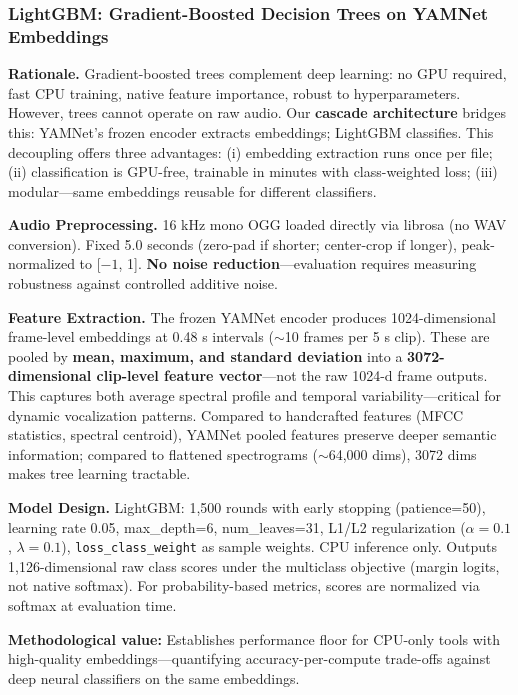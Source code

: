 \documentclass[conference]{IEEEtran}
\begin{document}
\subsubsection{LightGBM: Gradient-Boosted Decision Trees on YAMNet Embeddings}

\textbf{Rationale.} Gradient-boosted trees complement deep learning: no GPU required, fast CPU training, native feature importance, robust to hyperparameters. However, trees cannot operate on raw audio. Our \textbf{cascade architecture} bridges this: YAMNet's frozen encoder extracts embeddings; LightGBM classifies. This decoupling offers three advantages: (i) embedding extraction runs once per file; (ii) classification is GPU-free, trainable in minutes with class-weighted loss; (iii) modular—same embeddings reusable for different classifiers.

\textbf{Audio Preprocessing.} 16 kHz mono OGG loaded directly via librosa (no WAV conversion). Fixed 5.0 seconds (zero-pad if shorter; center-crop if longer), peak-normalized to [$-1$, 1]. \textbf{No noise reduction}—evaluation requires measuring robustness against controlled additive noise.

\textbf{Feature Extraction.} The frozen YAMNet encoder produces 1024-dimensional frame-level embeddings at 0.48 s intervals ($\sim$10 frames per 5 s clip). These are pooled by \textbf{mean, maximum, and standard deviation} into a \textbf{3072-dimensional clip-level feature vector}---not the raw 1024-d frame outputs. This captures both average spectral profile and temporal variability—critical for dynamic vocalization patterns. Compared to handcrafted features (MFCC statistics, spectral centroid), YAMNet pooled features preserve deeper semantic information; compared to flattened spectrograms ($\sim$64,000 dims), 3072 dims makes tree learning tractable.

\textbf{Model Design.} LightGBM: 1,500 rounds with early stopping (patience=50), learning rate 0.05, max\_depth=6, num\_leaves=31, L1/L2 regularization ($\alpha=0.1$, $\lambda=0.1$), \texttt{loss\_class\_weight} as sample weights. CPU inference only. Outputs 1,126-dimensional raw class scores under the multiclass objective (margin logits, not native softmax). For probability-based metrics, scores are normalized via softmax at evaluation time.

\textbf{Methodological value:} Establishes performance floor for CPU-only tools with high-quality embeddings---quantifying accuracy-per-compute trade-offs against deep neural classifiers on the same embeddings.
\end{document}
